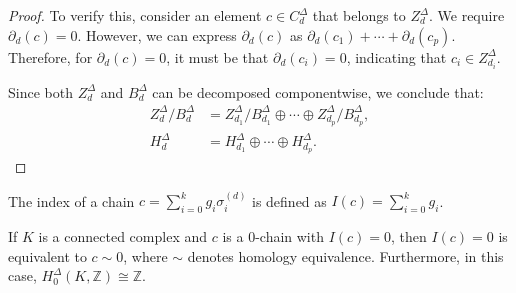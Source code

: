\begin{proof}
	To verify this, consider an element \( c \in C^{\Delta}_{d} \) that belongs to \( Z^{\Delta}_{d} \). We require \( \partial_{d}(c) = 0 \). However, we can express \( \partial_{d}(c) \) as \( \partial_{d}(c_{1}) + \cdots + \partial_{d}(c_{p}) \). Therefore, for \( \partial_{d}(c) = 0 \), it must be that \( \partial_{d}(c_{i}) = 0 \), indicating that \( c_{i} \in Z^{\Delta}_{d_i} \).
				
	Since both \( Z^{\Delta}_{d} \) and \( B^{\Delta}_{d} \) can be decomposed componentwise, we conclude that:
	\begin{align}
		Z^{\Delta}_{d} / B^{\Delta}_{d} &= Z^{\Delta}_{d_1} / B^{\Delta}_{d_1} \oplus \cdots \oplus Z^{\Delta}_{d_p} / B^{\Delta}_{d_p}, \\
		H^{\Delta}_{d} &= H^{\Delta}_{d_1} \oplus \cdots \oplus H^{\Delta}_{d_p}. 
	\end{align}
\end{proof}

\begin{definition}[Index]
The index of a chain $c = \sum_{i=0}^{k} g_i \sigma_i^{(d)}$ is defined as $I(c) = \sum_{i=0}^kg_i$.
\end{definition}

\begin{proposition}{\cite[Proposition 2.7]{hatcher2005algebraic}}
	\label{decomp}
	If \( K \) is a connected complex and \( c \) is a \( 0 \)-chain with \( I(c) = 0 \), then \( I(c) = 0 \) is equivalent to \( c \sim 0 \), where \( \sim \) denotes homology equivalence. Furthermore, in this case, \( H^{\Delta}_{0}(K, \mathbb{Z}) \cong \mathbb{Z} \).
\end{proposition}

